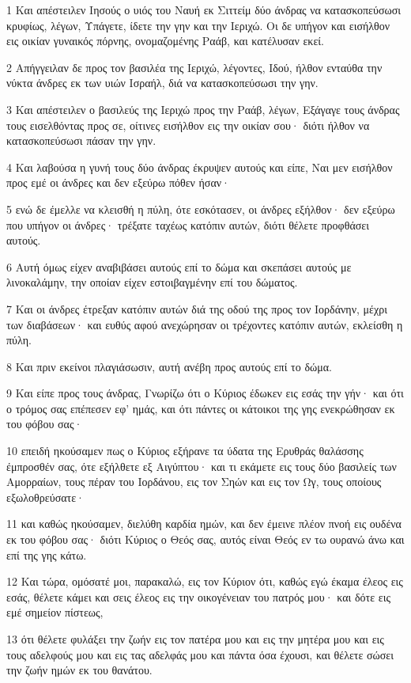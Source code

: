 \par 1 Και απέστειλεν Ιησούς ο υιός του Ναυή εκ Σιττείμ δύο άνδρας να κατασκοπεύσωσι κρυφίως, λέγων, Υπάγετε, ίδετε την γην και την Ιεριχώ. Οι δε υπήγον και εισήλθον εις οικίαν γυναικός πόρνης, ονομαζομένης Ραάβ, και κατέλυσαν εκεί.
\par 2 Απήγγειλαν δε προς τον βασιλέα της Ιεριχώ, λέγοντες, Ιδού, ήλθον ενταύθα την νύκτα άνδρες εκ των υιών Ισραήλ, διά να κατασκοπεύσωσι την γην.
\par 3 Και απέστειλεν ο βασιλεύς της Ιεριχώ προς την Ραάβ, λέγων, Εξάγαγε τους άνδρας τους εισελθόντας προς σε, οίτινες εισήλθον εις την οικίαν σου· διότι ήλθον να κατασκοπεύσωσι πάσαν την γην.
\par 4 Και λαβούσα η γυνή τους δύο άνδρας έκρυψεν αυτούς και είπε, Ναι μεν εισήλθον προς εμέ οι άνδρες και δεν εξεύρω πόθεν ήσαν·
\par 5 ενώ δε έμελλε να κλεισθή η πύλη, ότε εσκότασεν, οι άνδρες εξήλθον· δεν εξεύρω που υπήγον οι άνδρες· τρέξατε ταχέως κατόπιν αυτών, διότι θέλετε προφθάσει αυτούς.
\par 6 Αυτή όμως είχεν αναβιβάσει αυτούς επί το δώμα και σκεπάσει αυτούς με λινοκαλάμην, την οποίαν είχεν εστοιβαγμένην επί του δώματος.
\par 7 Και οι άνδρες έτρεξαν κατόπιν αυτών διά της οδού της προς τον Ιορδάνην, μέχρι των διαβάσεων· και ευθύς αφού ανεχώρησαν οι τρέχοντες κατόπιν αυτών, εκλείσθη η πύλη.
\par 8 Και πριν εκείνοι πλαγιάσωσιν, αυτή ανέβη προς αυτούς επί το δώμα.
\par 9 Και είπε προς τους άνδρας, Γνωρίζω ότι ο Κύριος έδωκεν εις εσάς την γήν· και ότι ο τρόμος σας επέπεσεν εφ' ημάς, και ότι πάντες οι κάτοικοι της γης ενεκρώθησαν εκ του φόβου σας·
\par 10 επειδή ηκούσαμεν πως ο Κύριος εξήρανε τα ύδατα της Ερυθράς θαλάσσης έμπροσθέν σας, ότε εξήλθετε εξ Αιγύπτου· και τι εκάμετε εις τους δύο βασιλείς των Αμορραίων, τους πέραν του Ιορδάνου, εις τον Σηών και εις τον Ωγ, τους οποίους εξωλοθρεύσατε·
\par 11 και καθώς ηκούσαμεν, διελύθη καρδία ημών, και δεν έμεινε πλέον πνοή εις ουδένα εκ του φόβου σας· διότι Κύριος ο Θεός σας, αυτός είναι Θεός εν τω ουρανώ άνω και επί της γης κάτω.
\par 12 Και τώρα, ομόσατέ μοι, παρακαλώ, εις τον Κύριον ότι, καθώς εγώ έκαμα έλεος εις εσάς, θέλετε κάμει και σεις έλεος εις την οικογένειαν του πατρός μου· και δότε εις εμέ σημείον πίστεως,
\par 13 ότι θέλετε φυλάξει την ζωήν εις τον πατέρα μου και εις την μητέρα μου και εις τους αδελφούς μου και εις τας αδελφάς μου και πάντα όσα έχουσι, και θέλετε σώσει την ζωήν ημών εκ του θανάτου.
